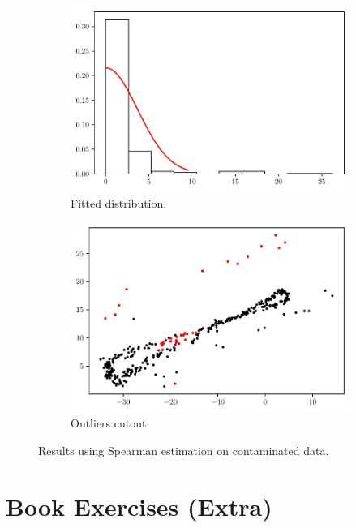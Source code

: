 \documentclass[11pt]{article}
\theoremstyle{definition}
\theoremstyle{remark}
\theoremstyle{remark}
\begin{document}
\begin{figure}[H]
  \centering
  \begin{subfigure}[t]{0.475\textwidth}
    \centering
    \includegraphics[scale=0.45]{../figs/spearman_hist_with-noise.pdf}
    \caption{Fitted distribution.}
  \end{subfigure}
  \begin{subfigure}[t]{0.475\textwidth}
    \centering
    \includegraphics[scale=0.45]{../figs/spearman_scatter_with-noise.pdf}
    \caption{Outliers cutout.}
  \end{subfigure}
  \caption{Results using Spearman estimation on contaminated data.}
  \label{fig:spearman_cut_wnoise}
\end{figure}


\section{Book Exercises (Extra)}
\end{document}
